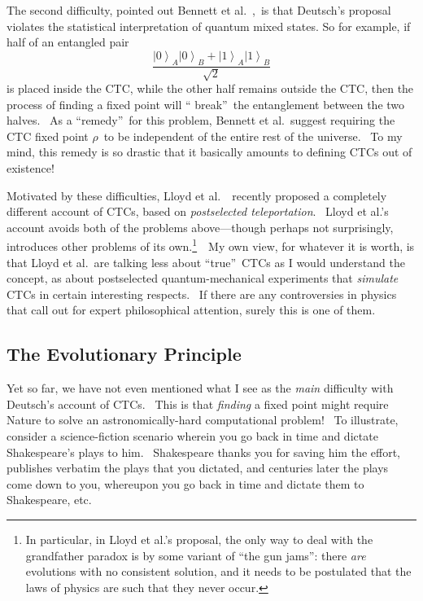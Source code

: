 \documentclass[12pt,onecolumn]{article}%
\begin{document}
The second difficulty, pointed out Bennett et al.\ \cite{blss},\ is that
Deutsch's proposal violates the statistical interpretation of quantum mixed
states. So for example, if half of an entangled pair%
\[
\frac{\left\vert 0\right\rangle _{A}\left\vert 0\right\rangle _{B}+\left\vert
1\right\rangle _{A}\left\vert 1\right\rangle _{B}}{\sqrt{2}}%
\]
is placed inside the CTC, while the other half remains outside the CTC, then
the process of finding a fixed point will \textquotedblleft
break\textquotedblright\ the entanglement between the two halves. \ As a
\textquotedblleft remedy\textquotedblright\ for this problem, Bennett et
al.\ suggest requiring the CTC fixed point $\rho$\ to be independent of the
entire rest of the universe. \ To my mind, this remedy is so drastic that it
basically amounts to defining CTCs out of existence!

Motivated by these difficulties, Lloyd et al.\ \cite{lmggs}\ recently proposed
a completely different account of CTCs, based on \textit{postselected
teleportation}. \ Lloyd et al.'s account avoids both of the problems
above---though perhaps not surprisingly, introduces other problems of its
own.\footnote{In particular, in Lloyd et al.'s proposal, the only way to deal
with the grandfather paradox is by some variant of \textquotedblleft the gun
jams\textquotedblright: there \textit{are} evolutions with no consistent
solution, and it needs to be postulated that the laws of physics are such that
they never occur.}\ \ My own view, for whatever it is worth, is that Lloyd et
al.\ are talking less about \textquotedblleft true\textquotedblright\ CTCs as
I would understand the concept, as about postselected quantum-mechanical
experiments that \textit{simulate} CTCs in certain interesting respects. \ If
there are any controversies in physics that call out for expert philosophical
attention, surely this is one of them.

\subsection{The Evolutionary Principle\label{EP}}

Yet so far, we have not even mentioned what I see as the \textit{main}
difficulty with Deutsch's account of CTCs. \ This is that \textit{finding} a
fixed point might require Nature to solve an astronomically-hard computational
problem! \ To illustrate, consider a science-fiction scenario wherein you go
back in time and dictate Shakespeare's plays to him. \ Shakespeare thanks you
for saving him the effort, publishes verbatim the plays that you dictated, and
centuries later the plays come down to you, whereupon you go back in time and
dictate them to Shakespeare, etc.
\end{document}
